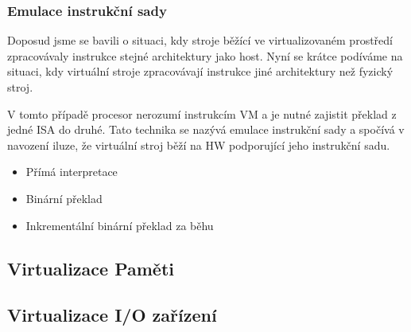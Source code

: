 \subsubsection{Emulace instrukční sady}
\label{subsubsection:isa_emulation}

Doposud jsme se bavili o situaci, kdy stroje běžící ve virtualizovaném prostředí zpracovávaly instrukce stejné architektury jako host. Nyní se krátce podíváme na situaci, kdy virtuální stroje zpracovávají instrukce
jiné architektury než fyzický stroj.

V tomto případě procesor nerozumí instrukcím VM a je nutné zajistit překlad z jedné ISA do druhé. Tato technika se nazývá emulace instrukční sady a spočívá v navození iluze, že virtuální stroj běží
na HW podporující jeho instrukční sadu. 



\begin{itemize}
 \item Přímá interpretace
 \item Binární překlad
 \item Inkrementální binární překlad za běhu
\end{itemize}


\cite{virt3}



\subsection{Virtualizace Paměti}
\subsection{Virtualizace I/O zařízení}


